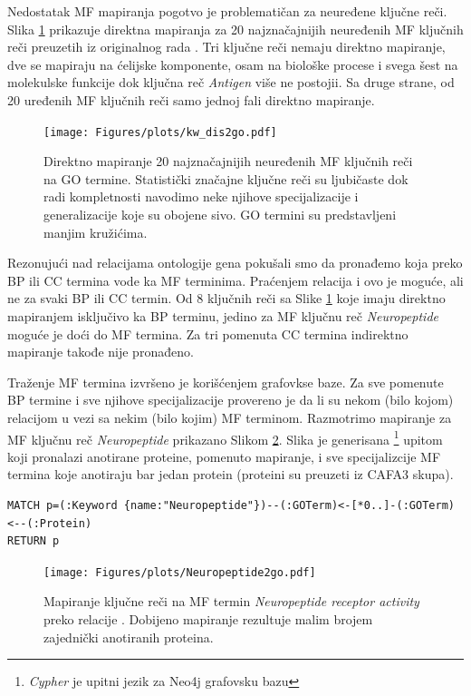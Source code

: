 Nedostatak MF mapiranja pogotvo je problematičan za neuređene ključne reči.
Slika \ref{fig:KWtop20dis} prikazuje direktna mapiranja za 20 najznačajnijih
neuređenih MF ključnih reči preuzetih iz originalnog rada \parencite{Xie2007}.
Tri ključne reči nemaju direktno mapiranje, dve se mapiraju na ćelijske
komponente, osam na biološke procese i svega šest na molekulske funkcije dok
ključna reč \textit{Antigen} više ne postojii. Sa druge strane, od 20 uređenih
MF ključnih reči samo jednoj fali direktno mapiranje.


\begin{figure}[!th]
\hspace*{-2.2cm} 
\texttt{[image: Figures/plots/kw\_dis2go.pdf]}
\decoRule
\caption {
  Direktno mapiranje 20 najznačajnijih neuređenih MF ključnih reči \parencite{Xie2007}
  na GO termine.  Statistički značajne ključne reči su ljubičaste dok radi
  kompletnosti navodimo neke njihove specijalizacije i generalizacije koje su
  obojene sivo. GO termini su predstavljeni manjim kružićima.
}
\label{fig:KWtop20dis}
\end{figure}


Rezonujući nad relacijama ontologije gena pokušali smo da pronađemo
 koja preko BP ili CC termina vode ka MF terminima.
Praćenjem relacija  i  ovo je moguće, ali
ne za svaki BP ili CC termin. Od 8 ključnih reči sa Slike \ref{fig:KWtop20dis} koje
imaju direktno mapiranjem isključivo ka BP terminu, jedino za MF ključnu reč
\textit{Neuropeptide} moguće je doći do MF termina. Za tri pomenuta CC termina
indirektno mapiranje takođe nije pronađeno.

Traženje MF termina izvršeno je korišćenjem  grafovkse baze. Za
sve pomenute BP termine i sve njihove specijalizacije provereno je da li su
nekom (bilo kojom) relacijom u vezi sa nekim (bilo kojim) MF terminom.
Razmotrimo mapiranje za MF ključnu reč \textit{Neuropeptide} prikazano Slikom
\ref{fig:neuropeptide}. Slika je generisana
\footnote{\textit{Cypher} je upitni jezik za Neo4j grafovsku
bazu} upitom koji pronalazi anotirane proteine, pomenuto mapiranje, i sve
specijalizcije MF termina koje anotiraju bar jedan protein (proteini su
preuzeti iz CAFA3  skupa).
\begin{verbatim}
MATCH p=(:Keyword {name:"Neuropeptide"})--(:GOTerm)<-[*0..]-(:GOTerm)<--(:Protein)
RETURN p
\end{verbatim}


\begin{figure}[!th]
\centering
\hspace*{-1.0cm} 
\texttt{[image: Figures/plots/Neuropeptide2go.pdf]}
\decoRule
\caption {
  Mapiranje ključne reči  na MF termin
  \textit{Neuropeptide receptor activity} preko relacije .
  Dobijeno mapiranje rezultuje malim brojem zajednički anotiranih proteina.
}
\label{fig:neuropeptide}
\end{figure}

